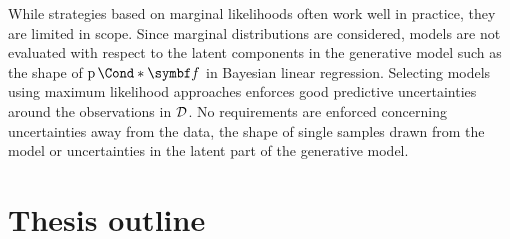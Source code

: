 While strategies based on marginal likelihoods often work well in practice, they are limited in scope.
Since marginal distributions are considered, models are not evaluated with respect to the latent components in the generative model such as the shape of $\Prob*{\mat{f}}$ in Bayesian linear regression.
Selecting models using maximum likelihood approaches enforces good predictive uncertainties around the observations in $\mathcal{D}$.
No requirements are enforced concerning uncertainties away from the data, the shape of single samples drawn from the model or uncertainties in the latent part of the generative model.


\section{Thesis outline}

